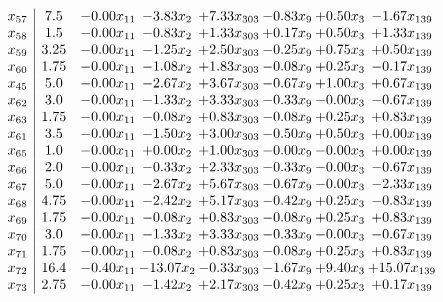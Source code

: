 \documentclass[8pt]{article}
\begin{document}
\[\begin{array}{c| c c@{\hskip 2pt} c@{\hskip 2pt} c@{\hskip 2pt} c@{\hskip 2pt} c@{\hskip 2pt} c@{\hskip 2pt} }
 x_{57}   &  7.5 & -0.00 x_{11} & -3.83 x_{2} & +  7.33 x_{303} & -0.83 x_{9} & +  0.50 x_{3} & -1.67 x_{139}\\
 x_{58}   &  1.5 & -0.00 x_{11} & -0.83 x_{2} & +  1.33 x_{303} & +  0.17 x_{9} & +  0.50 x_{3} & +  1.33 x_{139}\\
 x_{59}   &  3.25 & -0.00 x_{11} & -1.25 x_{2} & +  2.50 x_{303} & -0.25 x_{9} & +  0.75 x_{3} & +  0.50 x_{139}\\
 x_{60}   &  1.75 & -0.00 x_{11} & -1.08 x_{2} & +  1.83 x_{303} & -0.08 x_{9} & +  0.25 x_{3} & -0.17 x_{139}\\
 x_{45}   &  5.0 & -0.00 x_{11} & -2.67 x_{2} & +  3.67 x_{303} & -0.67 x_{9} & +  1.00 x_{3} & +  0.67 x_{139}\\
 x_{62}   &  3.0 & -0.00 x_{11} & -1.33 x_{2} & +  3.33 x_{303} & -0.33 x_{9} & -0.00 x_{3} & -0.67 x_{139}\\
 x_{63}   &  1.75 & -0.00 x_{11} & -0.08 x_{2} & +  0.83 x_{303} & -0.08 x_{9} & +  0.25 x_{3} & +  0.83 x_{139}\\
 x_{61}   &  3.5 & -0.00 x_{11} & -1.50 x_{2} & +  3.00 x_{303} & -0.50 x_{9} & +  0.50 x_{3} & +  0.00 x_{139}\\
 x_{65}   &  1.0 & -0.00 x_{11} & +  0.00 x_{2} & +  1.00 x_{303} & -0.00 x_{9} & -0.00 x_{3} & +  0.00 x_{139}\\
 x_{66}   &  2.0 & -0.00 x_{11} & -0.33 x_{2} & +  2.33 x_{303} & -0.33 x_{9} & -0.00 x_{3} & -0.67 x_{139}\\
 x_{67}   &  5.0 & -0.00 x_{11} & -2.67 x_{2} & +  5.67 x_{303} & -0.67 x_{9} & -0.00 x_{3} & -2.33 x_{139}\\
 x_{68}   &  4.75 & -0.00 x_{11} & -2.42 x_{2} & +  5.17 x_{303} & -0.42 x_{9} & +  0.25 x_{3} & -0.83 x_{139}\\
 x_{69}   &  1.75 & -0.00 x_{11} & -0.08 x_{2} & +  0.83 x_{303} & -0.08 x_{9} & +  0.25 x_{3} & +  0.83 x_{139}\\
 x_{70}   &  3.0 & -0.00 x_{11} & -1.33 x_{2} & +  3.33 x_{303} & -0.33 x_{9} & -0.00 x_{3} & -0.67 x_{139}\\
 x_{71}   &  1.75 & -0.00 x_{11} & -0.08 x_{2} & +  0.83 x_{303} & -0.08 x_{9} & +  0.25 x_{3} & +  0.83 x_{139}\\
 x_{72}   &  16.4 & -0.40 x_{11} & -13.07 x_{2} & -0.33 x_{303} & -1.67 x_{9} & +  9.40 x_{3} & + 15.07 x_{139}\\
 x_{73}   &  2.75 & -0.00 x_{11} & -1.42 x_{2} & +  2.17 x_{303} & -0.42 x_{9} & +  0.25 x_{3} & +  0.17 x_{139}\\

\end{array}\]
\end{document}
